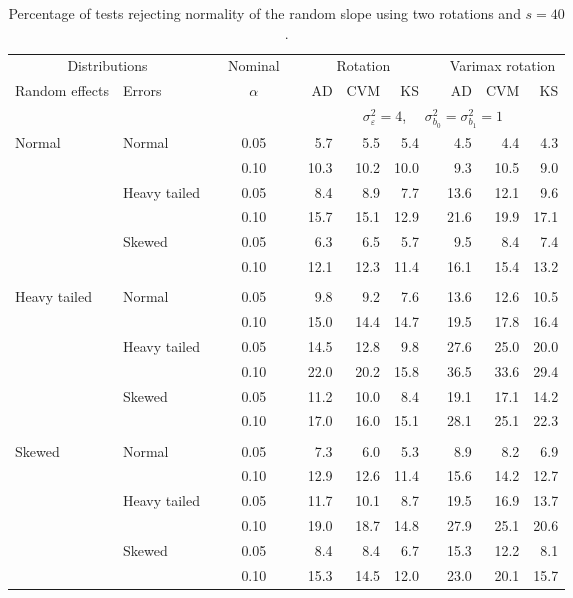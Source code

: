 \begin{table}[ht]
\centering
\caption{\label{tab:fixedsimb140} Percentage of tests rejecting normality of the random slope using two rotations and $s = 40$.}
\begin{scriptsize}
\begin{tabular}{ll p{.1cm} c p{.1cm} rrr p{.1cm} rrr}
  \hline
  \multicolumn{2}{c}{Distributions}& & Nominal & &  \multicolumn{3}{c}{Rotation} & & \multicolumn{3}{c}{Varimax rotation} \\ \cline{1-2} \cline{6-8} \cline{10-12}   
  Random effects & Errors & & $\alpha$ & & AD & CVM & KS & & AD & CVM & KS \\ 
   \hline
& && && \multicolumn{7}{c}{$\sigma_{\varepsilon}^2 = 4$, \ \ $\sigma_{b_0}^2 = \sigma_{b_1}^2 = 1$} \\ \cline{6-12}
\rowcolor{gray!20} Normal & Normal &  & 0.05 &  & 5.7 & 5.5 & 5.4 &  & 4.5 & 4.4 & 4.3 \\ 
\rowcolor{gray!20}    &  &  & 0.10 &  & 10.3 & 10.2 & 10.0 &  & 9.3 & 10.5 & 9.0 \\ 
\rowcolor{gray!20}    & Heavy tailed &  & 0.05 &  & 8.4 & 8.9 & 7.7 &  & 13.6 & 12.1 & 9.6 \\ 
\rowcolor{gray!20}    &  &  & 0.10 &  & 15.7 & 15.1 & 12.9 &  & 21.6 & 19.9 & 17.1 \\ 
\rowcolor{gray!20}    & Skewed &  & 0.05 &  & 6.3 & 6.5 & 5.7 &  & 9.5 & 8.4 & 7.4 \\ 
\rowcolor{gray!20}    &  &  & 0.10 &  & 12.1 & 12.3 & 11.4 &  & 16.1 & 15.4 & 13.2 \\ 
&&&&&&&&&&&\\
  Heavy tailed & Normal &  & 0.05 &  & 9.8 & 9.2 & 7.6 &  & 13.6 & 12.6 & 10.5 \\ 
   &  &  & 0.10 &  & 15.0 & 14.4 & 14.7 &  & 19.5 & 17.8 & 16.4 \\ 
   & Heavy tailed &  & 0.05 &  & 14.5 & 12.8 & 9.8 &  & 27.6 & 25.0 & 20.0 \\ 
   &  &  & 0.10 &  & 22.0 & 20.2 & 15.8 &  & 36.5 & 33.6 & 29.4 \\ 
   & Skewed &  & 0.05 &  & 11.2 & 10.0 & 8.4 &  & 19.1 & 17.1 & 14.2 \\ 
   &  &  & 0.10 &  & 17.0 & 16.0 & 15.1 &  & 28.1 & 25.1 & 22.3 \\ 
&&&&&&&&&&&\\
  Skewed & Normal &  & 0.05 &  & 7.3 & 6.0 & 5.3 &  & 8.9 & 8.2 & 6.9 \\ 
   &  &  & 0.10 &  & 12.9 & 12.6 & 11.4 &  & 15.6 & 14.2 & 12.7 \\ 
   & Heavy tailed &  & 0.05 &  & 11.7 & 10.1 & 8.7 &  & 19.5 & 16.9 & 13.7 \\ 
   &  &  & 0.10 &  & 19.0 & 18.7 & 14.8 &  & 27.9 & 25.1 & 20.6 \\ 
   & Skewed &  & 0.05 &  & 8.4 & 8.4 & 6.7 &  & 15.3 & 12.2 & 8.1 \\ 
   &  &  & 0.10 &  & 15.3 & 14.5 & 12.0 &  & 23.0 & 20.1 & 15.7 \\ 


\end{tabular}
\end{scriptsize}
\end{table}

